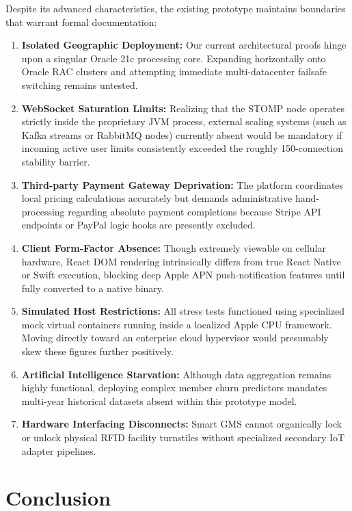 Despite its advanced characteristics, the existing prototype maintains
boundaries that warrant formal documentation:

\begin{enumerate}
\def\labelenumi{\arabic{enumi}.}
\tightlist
\item
  \textbf{Isolated Geographic Deployment:} Our current architectural
  proofs hinge upon a singular Oracle 21c processing core. Expanding
  horizontally onto Oracle RAC clusters and attempting immediate
  multi-datacenter failsafe switching remains untested.
\item
  \textbf{WebSocket Saturation Limits:} Realizing that the STOMP node
  operates strictly inside the proprietary JVM process, external scaling
  systems (such as Kafka streams or RabbitMQ nodes) currently absent
  would be mandatory if incoming active user limits consistently
  exceeded the roughly 150-connection stability barrier.
\item
  \textbf{Third-party Payment Gateway Deprivation:} The platform
  coordinates local pricing calculations accurately but demands
  administrative hand-processing regarding absolute payment completions
  because Stripe API endpoints or PayPal logic hooks are presently
  excluded.
\item
  \textbf{Client Form-Factor Absence:} Though extremely viewable on
  cellular hardware, React DOM rendering intrinsically differs from true
  React Native or Swift execution, blocking deep Apple APN
  push-notification features until fully converted to a native binary.
\item
  \textbf{Simulated Host Restrictions:} All stress tests functioned
  using specialized mock virtual containers running inside a localized
  Apple CPU framework. Moving directly toward an enterprise cloud
  hypervisor would presumably skew these figures further positively.
\item
  \textbf{Artificial Intelligence Starvation:} Although data aggregation
  remains highly functional, deploying complex member churn predictors
  mandates multi-year historical datasets absent within this prototype
  model.
\item
  \textbf{Hardware Interfacing Disconnects:} Smart GMS cannot
  organically lock or unlock physical RFID facility turnstiles without
  specialized secondary IoT adapter pipelines.
\end{enumerate}

\section{Conclusion}\label{conclusion}

